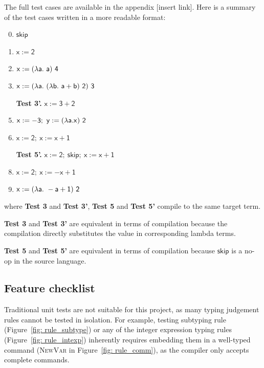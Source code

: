 \documentclass[12pt,a4paper]{report}
\theoremstyle{definition}
\begin{document}
    The full test cases are available in the appendix [insert link]. Here is a summary of the test cases written in a more readable format:
    \begin{enumerate}[label=\textbf{Test \arabic*.}, leftmargin=*]
        \setcounter{enumi}{-1}
        \item $\mathsf{skip}$
        \item $\mathsf{x := 2}$
        \item $\mathsf{x := (\mathnormal{\lambda} a.\ a)\ 4}$
        \item $\mathsf{x := (\mathnormal{\lambda} a.\ (\mathnormal{\lambda} b.\ a+b)\ 2)\ 3}$
        \item[\textbf{Test 3'.}] $\mathsf{x := 3 + 2}$
        \item $\mathsf{x := -3;\ y := (\mathnormal{\lambda} a. x)\ 2}$
        \item $\mathsf{x := 2;\ x := x + 1}$
        \item[\textbf{Test 5'.}] $\mathsf{x := 2;\ skip;\ x := x + 1}$
        \item $\mathsf{x := 2;\ x := -x + 1}$
        \item $\mathsf{x := (\mathnormal{\lambda} a.\ -a+1)\ 2}$
    \end{enumerate}
    where \textbf{Test 3} and \textbf{Test 3'}, \textbf{Test 5} and \textbf{Test 5'} compile to the same target term. 
    
    \textbf{Test 3} and \textbf{Test 3'} are equivalent in terms of compilation because the compilation directly substitutes the value in corresponding lambda terms. 
    
    \textbf{Test 5} and \textbf{Test 5'} are equivalent in terms of compilation because $\mathsf{skip}$ is a no-op in the source language.

    \subsection{Feature checklist}
    Traditional unit tests are not suitable for this project, as many typing judgement rules cannot be tested in isolation. For example, testing subtyping rule (Figure~\ref{fig: rule_subtype}) or any of the integer expression typing rules (Figure~\ref{fig: rule_intexp}) inherently requires embedding them in a well-typed command (\textsc{NewVar} in Figure~\ref{fig: rule_comm}), as the compiler only accepts complete commands. 
\end{document}
